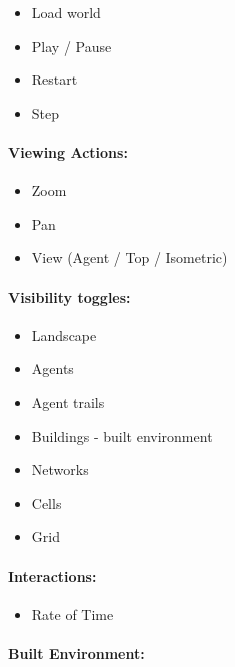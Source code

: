 \documentclass[]{article}
\begin{document}
\begin{itemize}
\itemsep1pt\parskip0pt
\item
  Load world
\item
  Play / Pause
\item
  Restart
\item
  Step
\end{itemize}

\paragraph{Viewing Actions:}\label{viewing-actions}

\begin{itemize}
\itemsep1pt\parskip0pt
\item
  Zoom
\item
  Pan
\item
  View (Agent / Top / Isometric)
\end{itemize}

\paragraph{Visibility toggles:}\label{visibility-toggles}

\begin{itemize}
\itemsep1pt\parskip0pt
\item
  Landscape
\item
  Agents
\item
  Agent trails
\item
  Buildings - built environment
\item
  Networks
\item
  Cells
\item
  Grid
\end{itemize}

\paragraph{Interactions:}\label{interactions}

\begin{itemize}
\itemsep1pt\parskip0pt
\item
  Rate of Time
\end{itemize}

\paragraph{Built Environment:}\label{built-environment-1}
\end{document}
